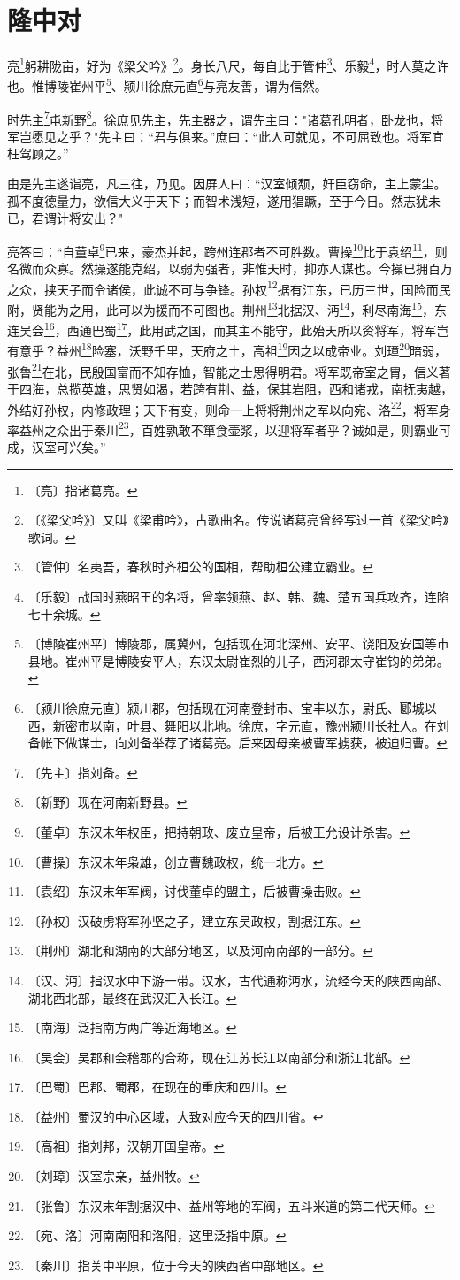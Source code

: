 \documentclass[12pt,UTF-8,openany]{ctexbook}
\begin{document}
\chapter{隆中对}

\begin{normalsize}
    
    亮\footnote{〔亮〕指诸葛亮。}躬耕陇亩，好为《梁父吟》\footnote{〔《梁父吟》〕又叫《梁甫吟》，古歌曲名。传说诸葛亮曾经写过一首《梁父吟》歌词。}。身长八尺，每自比于管仲\footnote{〔管仲〕名夷吾，春秋时齐桓公的国相，帮助桓公建立霸业。}、乐毅\footnote{〔乐毅〕战国时燕昭王的名将，曾率领燕、赵、韩、魏、楚五国兵攻齐，连陷七十余城。}，时人莫之许也。惟博陵崔州平\footnote{〔博陵崔州平〕博陵郡，属冀州，包括现在河北深州、安平、饶阳及安国等市县地。崔州平是博陵安平人，东汉太尉崔烈的儿子，西河郡太守崔钧的弟弟。}、颍川徐庶元直\footnote{〔颍川徐庶元直〕颍川郡，包括现在河南登封市、宝丰以东，尉氏、郾城以西，新密市以南，叶县、舞阳以北地。徐庶，字元直，豫州颍川长社人。在刘备帐下做谋士，向刘备举荐了诸葛亮。后来因母亲被曹军掳获，被迫归曹。}与亮友善，谓为信然。
    
    时先主\footnote{〔先主〕指刘备。}屯新野\footnote{〔新野〕现在河南新野县。}。徐庶见先主，先主器之，谓先主曰："诸葛孔明者，卧龙也，将军岂愿见之乎？"先主曰：“君与俱来。”庶曰：“此人可就见，不可屈致也。将军宜枉驾顾之。”
    
    由是先主遂诣亮，凡三往，乃见。因屏人曰：“汉室倾颓，奸臣窃命，主上蒙尘。孤不度德量力，欲信大义于天下；而智术浅短，遂用猖蹶，至于今日。然志犹未已，君谓计将安出？"
    
    亮答曰：“自董卓\footnote{〔董卓〕东汉末年权臣，把持朝政、废立皇帝，后被王允设计杀害。}已来，豪杰并起，跨州连郡者不可胜数。曹操\footnote{〔曹操〕东汉末年枭雄，创立曹魏政权，统一北方。}比于袁绍\footnote{〔袁绍〕东汉末年军阀，讨伐董卓的盟主，后被曹操击败。}，则名微而众寡。然操遂能克绍，以弱为强者，非惟天时，抑亦人谋也。今操已拥百万之众，挟天子而令诸侯，此诚不可与争锋。孙权\footnote{〔孙权〕汉破虏将军孙坚之子，建立东吴政权，割据江东。}据有江东，已历三世，国险而民附，贤能为之用，此可以为援而不可图也。荆州\footnote{〔荆州〕湖北和湖南的大部分地区，以及河南南部的一部分。}北据汉、沔\footnote{〔汉、沔〕指汉水中下游一带。汉水，古代通称沔水，流经今天的陕西南部、湖北西北部，最终在武汉汇入长江。}，利尽南海\footnote{〔南海〕泛指南方两广等近海地区。}，东连吴会\footnote{〔吴会〕吴郡和会稽郡的合称，现在江苏长江以南部分和浙江北部。}，西通巴蜀\footnote{〔巴蜀〕巴郡、蜀郡，在现在的重庆和四川。}，此用武之国，而其主不能守，此殆天所以资将军，将军岂有意乎？益州\footnote{〔益州〕蜀汉的中心区域，大致对应今天的四川省。}险塞，沃野千里，天府之土，高祖\footnote{〔高祖〕指刘邦，汉朝开国皇帝。}因之以成帝业。刘璋\footnote{〔刘璋〕汉室宗亲，益州牧。}暗弱，张鲁\footnote{〔张鲁〕东汉末年割据汉中、益州等地的军阀，五斗米道的第二代天师。}在北，民殷国富而不知存恤，智能之士思得明君。将军既帝室之胄，信义著于四海，总揽英雄，思贤如渴，若跨有荆、益，保其岩阻，西和诸戎，南抚夷越，外结好孙权，内修政理；天下有变，则命一上将将荆州之军以向宛、洛\footnote{〔宛、洛〕河南南阳和洛阳，这里泛指中原。}，将军身率益州之众出于秦川\footnote{〔秦川〕指关中平原，位于今天的陕西省中部地区。}，百姓孰敢不箪食壶浆，以迎将军者乎？诚如是，则霸业可成，汉室可兴矣。”
    

\end{normalsize}
\end{document}
